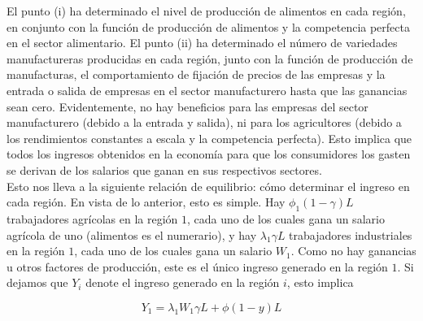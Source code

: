 El punto (i) ha determinado el nivel de producción de alimentos en cada región, en conjunto con la función de producción de alimentos y la competencia perfecta en el sector alimentario. El punto (ii) ha determinado el número de variedades manufactureras producidas en cada región, junto con la función de producción de manufacturas, el comportamiento de fijación de precios de las empresas y la entrada o salida de empresas en el sector manufacturero hasta que las ganancias sean cero. Evidentemente, no hay beneficios para las empresas del sector manufacturero (debido a la entrada y salida), ni para los agricultores (debido a los rendimientos constantes a escala y la competencia perfecta). Esto implica que todos los ingresos obtenidos en la economía para que los consumidores los gasten se derivan de los salarios que ganan en sus respectivos sectores. \\
Esto nos lleva a la siguiente relación de equilibrio: cómo determinar el ingreso en cada región. En vista de lo anterior, esto es simple. Hay $\phi_1(1-\gamma)L$ trabajadores agrícolas en la región $1$, cada uno de los cuales gana un salario agrícola de uno (alimentos es el numerario), y hay $\lambda_1 \gamma L$ trabajadores industriales en la región $1$, cada uno de los cuales gana un salario $W_1$. Como no hay ganancias u otros factores de producción, este es el único ingreso generado en la región $1$. Si dejamos que $Y_i$ denote el ingreso generado en la región $i$, esto implica

\begin{equation}
    Y_1 = \lambda_1 W_1 \gamma L + \phi (1-y)L
\end{equation}

